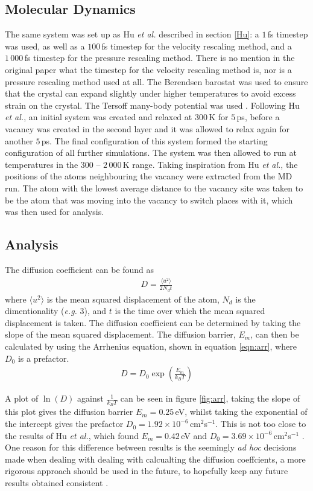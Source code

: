 \documentclass[10pt,a4paper,twocolumn,twoside]{extarticle}
\newcommand{\al}{\emph{et al.}}
\begin{document}
\subsection{Molecular Dynamics}
The same system was set up as Hu {\al} described in section \ref{Hu}: a $1$\,fs timestep was used, as well as a $100$\,fs timestep for the velocity rescaling method, and a $1\,000$\,fs timestep for the pressure rescaling method. There is no mention in the original paper what the timestep for the velocity rescaling method is, nor is a pressure rescaling method used at all. The Berendsen barostat was used to ensure that the crystal can expand slightly under higher temperatures to avoid excess strain on the crystal. The Tersoff many-body potential was used \cite{Tersoff}. Following Hu {\al}, an initial system was created and relaxed at $300$\,K for $5$\,ps, before a vacancy was created in the second layer and it was allowed to relax again for another $5$\,ps. The final configuration of this system formed the starting configuration of all further simulations. The system was then allowed to run at temperatures in the $300$ -- $2\,000$\,K range. Taking inspiration from Hu {\al}, the positions of the atoms neighbouring the vacancy were extracted from the MD run. The atom with the lowest average distance to the vacancy site was taken to be the atom that was moving into the vacancy to switch places with it, which was then used for analysis. 
\subsection{Analysis}
The diffusion coefficient can be found as 
\begin{align}
	D = \frac{\langle u^2 \rangle}{2N_dt}
\end{align}
where $\langle u^2 \rangle$ is the mean squared displacement of the atom, $N_d$ is the dimentionality (\emph{e.g.} 3), and $t$ is the time over which the mean squared displacement is taken. The diffusion coefficient can be determined by taking the slope of the mean squared displacement. The diffusion barrier, $E_m$, can then be calculated by using the Arrhenius equation, shown in equation \ref{eqn:arr}, where $D_0$ is a prefactor. 
\begin{align}
	\label{eqn:arr}
	D = D_0 \exp(\frac{E_m}{k_BT})
\end{align}

A plot of $\ln(D)$ against $\frac{1}{k_BT}$ can be seen in figure \ref{fig:arr}, taking the slope of this plot gives the diffusion barrier $E_m = 0.25$\,eV, whilst taking the exponential of the intercept gives the prefactor $D_0 = 1.92\times10^{-6}$\,cm$^2$s$^{-1}$. This is not too close to the results of Hu \al, which found $E_m = 0.42$\,eV and $D_0 = 3.69\times10^{-6}$\,cm$^2$s$^{-1}$ \cite{hu}. One reason for this difference between results is the seemingly \emph{ad hoc} decisions made when dealing with dealing with calcualting the diffusion coeffcients, a more rigorous approach should be used in the future, to hopefully keep any future results obtained consistent \cite{DiffusionRigorous}. 
\end{document}
